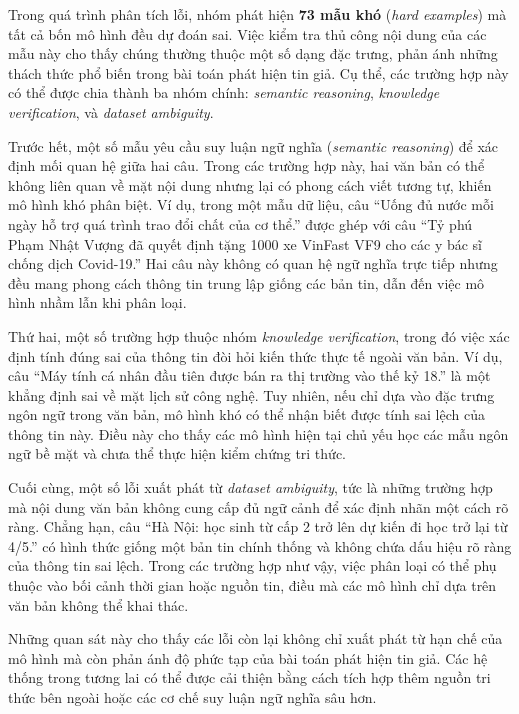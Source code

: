 \documentclass[12pt, a4paper]{report}
\newcommand{\nHardExamples}{73}
\begin{document}
Trong quá trình phân tích lỗi, nhóm phát hiện \textbf{\nHardExamples{} mẫu khó} (\textit{hard examples}) mà tất cả bốn mô hình đều dự đoán sai. Việc kiểm tra thủ công nội dung của các mẫu này cho thấy chúng thường thuộc một số dạng đặc trưng, phản ánh những thách thức phổ biến trong bài toán phát hiện tin giả. Cụ thể, các trường hợp này có thể được chia thành ba nhóm chính: \textit{semantic reasoning}, \textit{knowledge verification}, và \textit{dataset ambiguity}.

Trước hết, một số mẫu yêu cầu suy luận ngữ nghĩa (\textit{semantic reasoning}) để xác định mối quan hệ giữa hai câu. Trong các trường hợp này, hai văn bản có thể không liên quan về mặt nội dung nhưng lại có phong cách viết tương tự, khiến mô hình khó phân biệt. Ví dụ, trong một mẫu dữ liệu, câu ``Uống đủ nước mỗi ngày hỗ trợ quá trình trao đổi chất của cơ thể.'' được ghép với câu ``Tỷ phú Phạm Nhật Vượng đã quyết định tặng 1000 xe VinFast VF9 cho các y bác sĩ chống dịch Covid-19.'' Hai câu này không có quan hệ ngữ nghĩa trực tiếp nhưng đều mang phong cách thông tin trung lập giống các bản tin, dẫn đến việc mô hình nhầm lẫn khi phân loại.

Thứ hai, một số trường hợp thuộc nhóm \textit{knowledge verification}, trong đó việc xác định tính đúng sai của thông tin đòi hỏi kiến thức thực tế ngoài văn bản. Ví dụ, câu ``Máy tính cá nhân đầu tiên được bán ra thị trường vào thế kỷ 18.'' là một khẳng định sai về mặt lịch sử công nghệ. Tuy nhiên, nếu chỉ dựa vào đặc trưng ngôn ngữ trong văn bản, mô hình khó có thể nhận biết được tính sai lệch của thông tin này. Điều này cho thấy các mô hình hiện tại chủ yếu học các mẫu ngôn ngữ bề mặt và chưa thể thực hiện kiểm chứng tri thức.

Cuối cùng, một số lỗi xuất phát từ \textit{dataset ambiguity}, tức là những trường hợp mà nội dung văn bản không cung cấp đủ ngữ cảnh để xác định nhãn một cách rõ ràng. Chẳng hạn, câu ``Hà Nội: học sinh từ cấp 2 trở lên dự kiến đi học trở lại từ 4/5.'' có hình thức giống một bản tin chính thống và không chứa dấu hiệu rõ ràng của thông tin sai lệch. Trong các trường hợp như vậy, việc phân loại có thể phụ thuộc vào bối cảnh thời gian hoặc nguồn tin, điều mà các mô hình chỉ dựa trên văn bản không thể khai thác.

Những quan sát này cho thấy các lỗi còn lại không chỉ xuất phát từ hạn chế của mô hình mà còn phản ánh độ phức tạp của bài toán phát hiện tin giả. Các hệ thống trong tương lai có thể được cải thiện bằng cách tích hợp thêm nguồn tri thức bên ngoài hoặc các cơ chế suy luận ngữ nghĩa sâu hơn.
\end{document}
